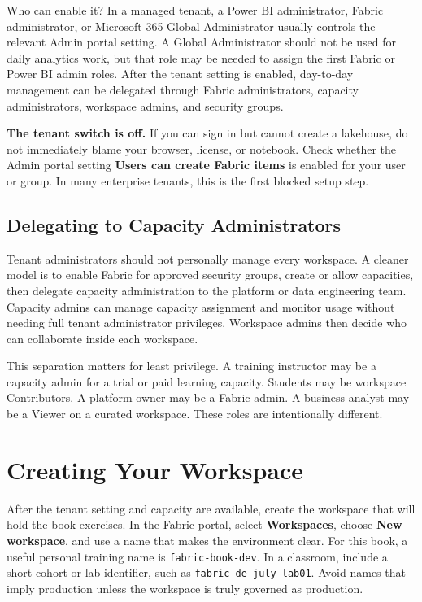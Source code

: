 Who can enable it? In a managed tenant, a Power BI administrator, Fabric administrator, or Microsoft 365 Global Administrator usually controls the relevant Admin portal setting. A Global Administrator should not be used for daily analytics work, but that role may be needed to assign the first Fabric or Power BI admin roles. After the tenant setting is enabled, day-to-day management can be delegated through Fabric administrators, capacity administrators, workspace admins, and security groups.

\begin{pitfall}
\textbf{The tenant switch is off.} If you can sign in but cannot create a lakehouse, do not immediately blame your browser, license, or notebook. Check whether the Admin portal setting \textbf{Users can create Fabric items} is enabled for your user or group. In many enterprise tenants, this is the first blocked setup step.
\end{pitfall}

\subsection{Delegating to Capacity Administrators}
Tenant administrators should not personally manage every workspace. A cleaner model is to enable Fabric for approved security groups, create or allow capacities, then delegate capacity administration to the platform or data engineering team. Capacity admins can manage capacity assignment and monitor usage without needing full tenant administrator privileges. Workspace admins then decide who can collaborate inside each workspace.

This separation matters for least privilege. A training instructor may be a capacity admin for a trial or paid learning capacity. Students may be workspace Contributors. A platform owner may be a Fabric admin. A business analyst may be a Viewer on a curated workspace. These roles are intentionally different.

\section{Creating Your Workspace}
After the tenant setting and capacity are available, create the workspace that will hold the book exercises. In the Fabric portal, select \textbf{Workspaces}, choose \textbf{New workspace}, and use a name that makes the environment clear. For this book, a useful personal training name is \texttt{fabric-book-dev}. In a classroom, include a short cohort or lab identifier, such as \texttt{fabric-de-july-lab01}. Avoid names that imply production unless the workspace is truly governed as production.

